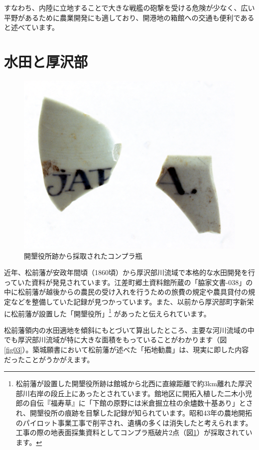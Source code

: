 \documentclass[11pt,report]{jsbook}
\begin{document}
すなわち、内陸に立地することで大きな戦艦の砲撃を受ける危険が少なく、広い平野があるために農業開発にも適しており、開港地の箱館への交通も便利であると述べています。


\newpage
\section{水田と厚沢部}
\begin{figure}
\vspace*{-\intextsep} 
\centering
\includegraphics[width=15zw]{fig/11comp.png}
\caption{開墾役所跡から採取されたコンプラ瓶}
\label{fig11comp}
\end{figure}

近年、松前藩が安政年間頃（1860頃）から厚沢部川流域で本格的な水田開発を行っていた資料が発見されています。江差町郷土資料館所蔵の「脇家文書-038」の中に松前藩が越後からの農民の受け入れを行うための旅費の規定や農具貸付の規定などを整備していた記録が見つかっています。また、以前から厚沢部町字新栄に松前藩が設置した「開墾役所」\footnote{
松前藩が設置した開墾役所跡は館城から北西に直線距離で約3km離れた厚沢部川右岸の段丘上にあったとされています。館地区に開拓入植した二木小児郎の自伝『福寿草』に「下館の原野には米倉掘立柱の余燼数十基あり」とされ、開墾役所の痕跡を目撃した記録が知られています。昭和43年の農地開拓のパイロット事業工事で削平され、遺構の多くは消失したと考えられます。工事の際の地表面採集資料としてコンプラ瓶破片2点（図\ref{fig11comp}）が採取されています。
}
があったと伝えられています。

松前藩領内の水田適地を傾斜にもとづいて算出したところ、主要な河川流域の中でも厚沢部川流域が特に大きな面積をもっていることがわかります（図\ref{fig03}）。築城願書において松前藩が述べた「拓地勧農」は、現実に即した内容だったことがうかがえます。
\end{document}
